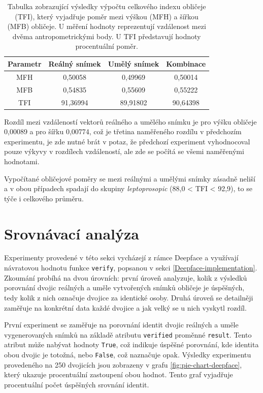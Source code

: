 \begin{table}[H]
        \centering
        \begin{tabular}{|c|c|c|c|}
                \hline
                Parametr & Reálný snímek & Umělý snímek & Kombinace \\
                \hline
                MFH & 0,50058 & 0,49969 & 0,50014 \\
                MFB & 0,54835 & 0,55609 & 0,55222 \\
                TFI & 91,36994 & 89,91802 & 90,64398 \\
                \hline
        \end{tabular}
        \caption{Tabulka zobrazující výsledky výpočtu celkového indexu obličeje (TFI), který vyjadřuje poměr mezi výškou (MFH) a šířkou (MFB) obličeje. U měření hodnoty reprezentují vzdálenost mezi dvěma antropometrickými body. U TFI představují hodnoty procentuální poměr.}
        \label{tab:tfi-values}
\end{table}

Rozdíl mezi vzdáleností vektorů reálného a umělého snímku je pro výšku obličeje 0,00089 a pro šířku 0,00774, což je třetina naměřeného rozdílu v předchozím experimentu, je zde nutné brát v potaz, že předchozí experiment vyhodnocoval pouze výkyvy v rozdílech vzdáleností, ale zde se počítá se všemi naměřenými hodnotami.

Vypočítané obličejové poměry se mezi reálnými a umělými snímky zásadně neliší a v obou případech spadají do skupiny \textit{leptoprosopic} \cite{Jeremic2013} (88,0 < TFI < 92,9), to se týče i celkového průměru.

\section{Srovnávací analýza}

Experimenty provedené v této sekci vycházejí z rámce Deepface a využívají návratovou hodnotu funkce \texttt{verify}, popsanou v sekci \ref{Deepface-implementation}. Zkoumání probíhá na dvou úrovních: první úroveň analyzuje, kolik z výsledků porovnání dvojic reálných a uměle vytvořených snímků obličeje je úspěšných, tedy kolik z nich označuje dvojice za identické osoby. Druhá úroveň se detailněji zaměřuje na konkrétní data každé dvojice a jak velký se u nich vyskytl rozdíl.

\bigskip

\noindent První experiment se zaměřuje na porovnání identit dvojic reálných a uměle vygenerovaných snímků na základě atributu \texttt{verified} proměnné \texttt{result}. Tento atribut může nabývat hodnoty \texttt{True}, což indikuje úspěšné porovnání, kde identita obou dvojic je totožná, nebo \texttt{False}, což naznačuje opak. Výsledky experimentu provedeného na 250 dvojicích jsou zobrazeny v grafu \ref{fig:pie-chart-deepface}, který ukazuje procentuální zastoupení obou hodnot. Tento graf vyjadřuje procentuální počet úspěšných srovnání identit.

